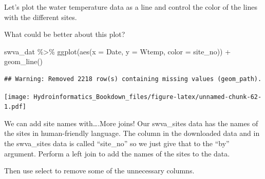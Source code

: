 \documentclass[
]{book}
\newenvironment{Shaded}{\begin{snugshade}}{\end{snugshade}}
\newcommand{\AttributeTok}[1]{\textcolor[rgb]{0.77,0.63,0.00}{#1}}
\newcommand{\FunctionTok}[1]{\textcolor[rgb]{0.00,0.00,0.00}{#1}}
\newcommand{\NormalTok}[1]{#1}
\newcommand{\OtherTok}[1]{\textcolor[rgb]{0.56,0.35,0.01}{#1}}
\newcommand{\SpecialCharTok}[1]{\textcolor[rgb]{0.00,0.00,0.00}{#1}}
\newcommand{\StringTok}[1]{\textcolor[rgb]{0.31,0.60,0.02}{#1}}
\begin{document}
\begin{Shaded}
\end{Shaded}

Let's plot the water temperature data as a line and control the color of the lines with the different sites.

What could be better about this plot?

\begin{Shaded}
\begin{Highlighting}[]
\NormalTok{swva\_dat }\SpecialCharTok{\%\textgreater{}\%} \FunctionTok{ggplot}\NormalTok{(}\FunctionTok{aes}\NormalTok{(}\AttributeTok{x =}\NormalTok{ Date, }\AttributeTok{y =}\NormalTok{ Wtemp, }\AttributeTok{color =}\NormalTok{ site\_no)) }\SpecialCharTok{+}
  \FunctionTok{geom\_line}\NormalTok{()}
\end{Highlighting}
\end{Shaded}

\begin{verbatim}
## Warning: Removed 2218 row(s) containing missing values (geom_path).
\end{verbatim}

\texttt{[image: Hydroinformatics\_Bookdown\_files/figure-latex/unnamed-chunk-62-1.pdf]}

We can add site names with\ldots.More joins! Our swva\_sites data has the names of the sites in human-friendly language. The column in the downloaded data and in the swva\_sites data is called ``site\_no'' so we just give that to the ``by'' argument. Perform a left join to add the names of the sites to the data.

Then use select to remove some of the unnecessary columns.
\end{document}
